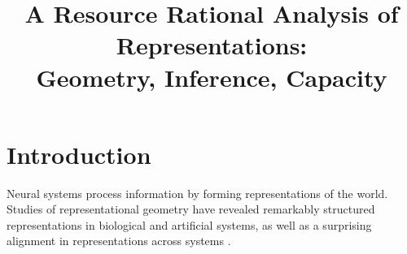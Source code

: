 \documentclass[11pt]{article}
\title{\textbf{A Resource Rational Analysis of Representations: \\ Geometry, Inference, Capacity}}
\author{}
\date{}
\begin{document}
\maketitle
\vspace{-3em}

\section{Introduction}

\cite{}Neural systems process information by forming representations of the world. Studies of representational geometry have revealed remarkably structured representations in biological \citep{kriegeskorte2013representational, behrens2018cognitive, perich2025neural} and artificial \citep{saxe2019mathematical, nanda2023progress, modell2025origins} systems, as well as a surprising  alignment in representations across systems \citep{sucholutsky2023getting, cao2024explanatory, huh2024platonic}. 
\end{document}
